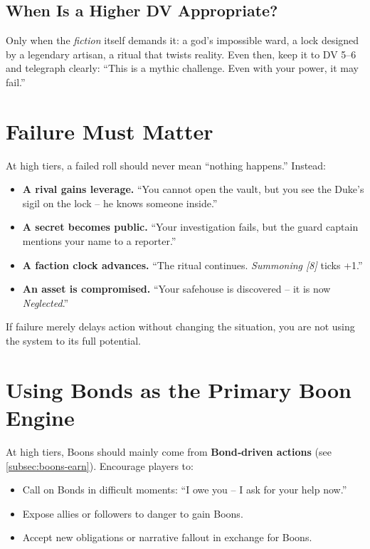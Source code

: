 \subsection*{When Is a Higher DV Appropriate?}
Only when the \emph{fiction} itself demands it: a god’s impossible ward, a lock designed by a legendary artisan, a ritual that twists reality. Even then, keep it to DV 5–6 and telegraph clearly: “This is a mythic challenge. Even with your power, it may fail.”

\section{Failure Must Matter}

At high tiers, a failed roll should never mean “nothing happens.” Instead:

\begin{itemize}
  \item \textbf{A rival gains leverage.} “You cannot open the vault, but you see the Duke’s sigil on the lock – he knows someone inside.”
  \item \textbf{A secret becomes public.} “Your investigation fails, but the guard captain mentions your name to a reporter.”
  \item \textbf{A faction clock advances.} “The ritual continues. \emph{Summoning [8]} ticks +1.”
  \item \textbf{An asset is compromised.} “Your safehouse is discovered – it is now \emph{Neglected}.”
\end{itemize}

If failure merely delays action without changing the situation, you are not using the system to its full potential.

\section{Using Bonds as the Primary Boon Engine}

At high tiers, Boons should mainly come from \textbf{Bond‑driven actions} (see \ref{subsec:boons-earn}). Encourage players to:
\begin{itemize}
  \item Call on Bonds in difficult moments: “I owe you – I ask for your help now.”
  \item Expose allies or followers to danger to gain Boons.
  \item Accept new obligations or narrative fallout in exchange for Boons.
\end{itemize}

